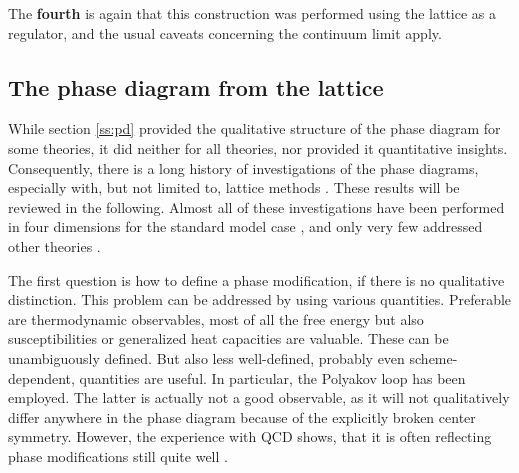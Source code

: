\documentclass[final,twoside,12pt]{article}
\newcommand*{\1}{1\!\!\!\bot}
\begin{document}
The {\bf fourth} is again that this construction was performed using the lattice as a regulator, and the usual caveats concerning the continuum limit apply.

\subsection{The phase diagram from the lattice}\label{ss:pdlat}

While section \ref{ss:pd} provided the qualitative structure of the phase diagram for some theories, it did neither for all theories, nor provided it quantitative insights. Consequently, there is a long history of investigations of the phase diagrams, especially with, but not limited to, lattice methods \cite{Lang:1981qg,Kikugawa:1982yh,Brower:1982yn,Kuhnelt:1983mw,Gerdt:1984ft,Evertz:1985fc,Langguth:1985eu,Langguth:1985dr,Gerdt:1985rb,Gerdt:1985xh,Olynyk:1985tr,Munehisa:1986jc,Evertz:1986vp,Hasenfratz:1986za,Bock:1989fk,Heller:1993yv,Campos:1997dc,Knechtli:1998gf,Knechtli:1999qe,Caudy:2007sf,Greensite:2008ss,Bonati:2009pf,Bonati:2009yi,Wurtz:2009gf,Lewis:2010ps,Maas:2014pba,Gongyo:2014jfa,Gies:2015lia,Biswal:2015rul,Maas:2016ngo,Gies:2016kkk,Bazavov:2019qih,Baier:1988sc}. These results will be reviewed in the following. Almost all of these investigations have been performed in four dimensions for the standard model case \cite{Kuhnelt:1983mw,Gerdt:1984ft,Evertz:1985fc,Langguth:1985eu,Langguth:1985dr,Gerdt:1985rb,Munehisa:1986jc,Evertz:1986vp,Hasenfratz:1986za,Bock:1989fk,Heller:1993yv,Campos:1997dc,Knechtli:1998gf,Knechtli:1999qe,Caudy:2007sf,Greensite:2008ss,Bonati:2009pf,Bonati:2009yi,Maas:2014pba,Gies:2015lia,Biswal:2015rul,Gies:2016kkk}, and only very few addressed other theories \cite{Kikugawa:1982yh,Brower:1982yn,Gupta:1983zv,Gerdt:1985xh,Olynyk:1985tr,Lee:1985yi,Shrock:1986fg,Shrock:1986bu,Gongyo:2014jfa,Maas:2016ngo,Lewis:2010ps,Wurtz:2009gf,Bazavov:2019qih,Baier:1988sc}.

The first question is how to define a phase modification, if there is no qualitative distinction. This problem can be addressed by using various quantities. Preferable are thermodynamic observables, most of all the free energy but also susceptibilities or generalized heat capacities are valuable. These can be unambiguously defined. But also less well-defined, probably even scheme-dependent, quantities are useful. In particular, the Polyakov loop has been employed. The latter is actually not a good observable, as it will not qualitatively differ anywhere in the phase diagram because of the explicitly broken center symmetry. However, the experience with QCD shows, that it is often reflecting phase modifications still quite well \cite{Gattringer:2010zz,Cossu:2007dk}.
\end{document}
